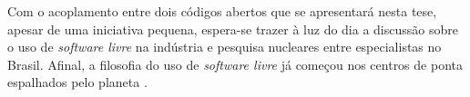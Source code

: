 Com o acoplamento entre dois códigos abertos que se apresentará nesta tese, apesar
de uma iniciativa pequena, espera-se trazer à luz do dia a discussão sobre o uso de \textit{software livre} na
indústria e pesquisa nucleares entre especialistas no Brasil. Afinal, a filosofia do uso de \textit{software livre}
já começou nos centros de ponta espalhados pelo planeta \cite{Romano2013, Boyd2014, Huff2016}.









